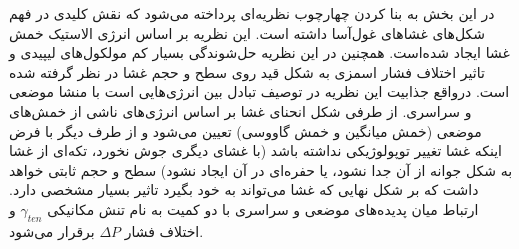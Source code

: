 در این بخش به بنا کردن چهارچوب نظریه‌ای پرداخته می‌شود که نقش کلیدی در فهم شکل‌های غشا‌های غول‌آسا داشته است. این نظریه بر اساس انرژی الاستیک خمش غشا ایجاد شده‌است. همچنین در این نظریه حل‌شوندگی بسیار کم مولکول‌های لیپیدی و تاثیر اختلاف فشار اسمزی به شکل قید روی سطح و حجم غشا در نظر گرفته شده است. درواقع جذابیت این نظریه در توصیف تبادل بین انرژی‌هایی است با منشا موضعی و سراسری. از طرفی شکل انحنای غشا بر اساس انرژی‌های ناشی از خمش‌های موضعی (خمش میانگین و خمش گاووسی) تعیین می‌شود و از طرف دیگر با فرض اینکه غشا تغییر توپولوژیکی نداشته باشد (با غشای دیگری جوش نخورد، تکه‌ای از غشا به شکل جوانه از آن جدا نشود، یا حفره‌ای در آن ایجاد نشود) سطح و حجم ثابتی خواهد داشت که بر شکل نهایی که غشا می‌تواند به خود بگیرد تاثیر بسیار مشخصی دارد. ارتباط میان پدیده‌های موضعی و سراسری با دو کمیت به نام تنش مکانیکی  
$\gamma_{ten}$
و اختلاف فشار
$\Delta P$
برقرار می‌شود.

